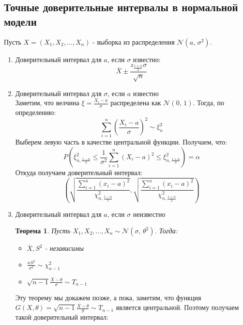 \documentclass[a4paper,12pt]{article}
\newcommand{\normal}[2]{\mathcal{N}(#1,\,#2)}
\newcommand{\sumin}{\sum\limits_{i=1}^n}
\newcommand{\sample}{X_1, X_2, ..., X_n}
\theoremstyle{named}
\newtheorem*{namedtheorem}{Теорема}
\begin{document}
\subsection{Точные доверительные интервалы в нормальной модели}
Пусть $X = (\sample)$ - выборка из распределения $\normal{a}{\sigma^2}$.
\begin{enumerate}
    \item Доверительный интервал для $a$, если $\sigma$ известно: 
    \begin{equation}
        \overline{X} \pm \frac{z_{\frac{1+\alpha}{2}}\sigma}{\sqrt{n}}
        \tag{$a$, $\sigma$ - known}
    \end{equation}
    \item Доверительный интервал для $\sigma$, если $a$ известно \\
    Заметим, что велчина $\xi = \frac{X_i - a}{\sigma}$ распределена как $\normal{0}{1}$. Тогда, по определению:
    $$
        \sumin \left(\frac{X_i - a}{\sigma}\right)^2 \sim \xi^2_n
    $$
    Выберем левую часть в качестве центральной функции. Получаем, что:
    $$
        P(\xi^2_{n, \frac{1-\alpha}{2}} \leq  \frac{1}{\sigma^2}\sumin (X_i - a)^2 \leq \xi^2_{n, \frac{1+\alpha}{2}}) = \alpha 
    $$
    Откуда получаем доверительный интервал:
    \begin{equation}
        \left(\sqrt{\frac{\sumin (x_i - a)^2}{\chi^2_{n, \frac{1-\alpha}{2}}}}, \sqrt{\frac{\sumin (x_i - a)^2}{\chi^2_{n, \frac{1+\alpha}{2}}}}\right)
        \tag{$\sigma$, $a$ - known}
    \end{equation}
    \item Доверительный интервал для $a$, если  $\sigma$ неизвестно \\
    \begin{namedtheorem}
        Пусть $\sample \sim \normal{\sigma}{\theta^2}$. Тогда:
        \begin{itemize}
            \item $\overline{X}, S^2$ - независимы 
            \item $\frac{nS^2}{\sigma^2} \sim \chi^2_{n-1}$
            \item $\sqrt{n-1}\frac{\overline{X}- \theta}{\sigma} \sim T_{n-1}$
        \end{itemize}
    \end{namedtheorem}
    Эту теорему мы докажем позже, а пока, заметим, что функция $G(X, \theta) = \sqrt{n-1}\frac{\overline{X} - \theta}{S} \sim T_{n-1}$ является 
    центральной. Поэтому получаем такой доверительный интервал:
    \begin{equation}

\end{equation}
\end{enumerate}
\end{document}
